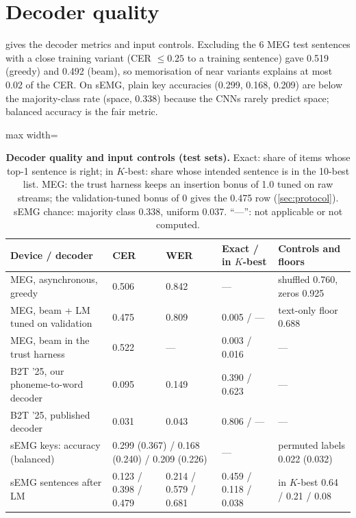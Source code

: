 \FloatBarrier
\section{Decoder quality}
\label{app:decoders}

 gives the decoder metrics and input controls. Excluding the 6 MEG test sentences with a close training variant (CER $\le 0.25$ to a training sentence) gave 0.519 (greedy) and 0.492 (beam), so memorisation of near variants explains at most 0.02 of the CER. On sEMG, plain key accuracies (0.299, 0.168, 0.209) are below the majority-class rate (space, 0.338) because the CNNs rarely predict space; balanced accuracy is the fair metric.

\begin{table}[H]
  \centering
  \caption{\textbf{Decoder quality and input controls (test sets).} Exact: share of items whose top-1 sentence is right; in $K$-best: share whose intended sentence is in the 10-best list. MEG: the trust harness keeps an insertion bonus of 1.0 tuned on raw streams; the validation-tuned bonus of 0 gives the 0.475 row (\cref{sec:protocol}). sEMG chance: majority class 0.338, uniform 0.037. ``---'': not applicable or not computed.}
  \label{tab:decoders}
  \small
  \begin{adjustbox}{max width=\linewidth}\begin{tabular}{@{}lllll@{}}
    \toprule
    \textbf{Device / decoder} & \textbf{CER} & \textbf{WER} & \textbf{Exact / in $K$-best} & \textbf{Controls and floors} \\
    \midrule
    MEG, asynchronous, greedy & 0.506 & 0.842 & --- & shuffled 0.760, zeros 0.925 \\
    MEG, beam + LM tuned on validation & 0.475 & 0.809 & 0.005 / --- & text-only floor 0.688 \\
    MEG, beam in the trust harness & 0.522 & --- & 0.003 / 0.016 & --- \\
    \midrule
    B2T '25, our phoneme-to-word decoder & 0.095 & 0.149 & 0.390 / 0.623 & --- \\
    B2T '25, published decoder & 0.031 & 0.043 & 0.806 / --- & --- \\
    \midrule
    sEMG keys: accuracy (balanced) & \multicolumn{2}{l}{0.299 (0.367) / 0.168 (0.240) / 0.209 (0.226)} & --- & permuted labels 0.022 (0.032) \\
    sEMG sentences after LM & 0.123 / 0.398 / 0.479 & 0.214 / 0.579 / 0.681 & 0.459 / 0.118 / 0.038 & in $K$-best 0.64 / 0.21 / 0.08 \\
    \bottomrule
  \end{tabular}\end{adjustbox}
\end{table}

